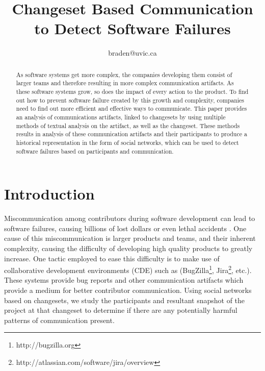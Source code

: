 \documentclass[conference]{IEEEtran}
\begin{document}
\title{Changeset Based Communication to Detect Software Failures}

\author{
braden@uvic.ca}

\maketitle

\begin{abstract}
As software systems get more complex, the companies developing them consist of larger teams and therefore resulting in more complex communication artifacts.  As these software systems grow, so does the impact of every action to the product.  To find out how to prevent software failure created by this growth and complexity, companies need to find out more efficient and effective ways to communicate.  This paper provides an analysis of communications artifacts, linked to changesets by using multiple methods of textual analysis on the artifact, as well as the changeset.  These methods results in analysis of these communication artifacts and their participants to produce a historical representation in the form of social networks, which can be used to detect software failures based on participants and communication.
\end{abstract}

\section{Introduction}

Miscommunication among contributors during software development can lead to software failures, causing billions of lost dollars or even lethal accidents \cite{Wolf:2009:PBF:1555001.1555017}. One cause of this miscommunication is larger products and teams, and their inherent complexity, causing the difficulty of developing high quality products to greatly increase.  One tactic employed to ease this difficulty is to make use of collaborative development environments (CDE) such as (BugZilla\footnote{http://bugzilla.org}, Jira\footnote{http://atlassian.com/software/jira/overview}, etc.)\cite{CDE}.  These systems provide bug reports and other communication artifacts which provide a medium for better contributor communication.  Using social networks based on changesets, we study the participants and resultant snapshot of the project at that changeset to determine if there are any potentially harmful patterns of communication present.
\end{document}

